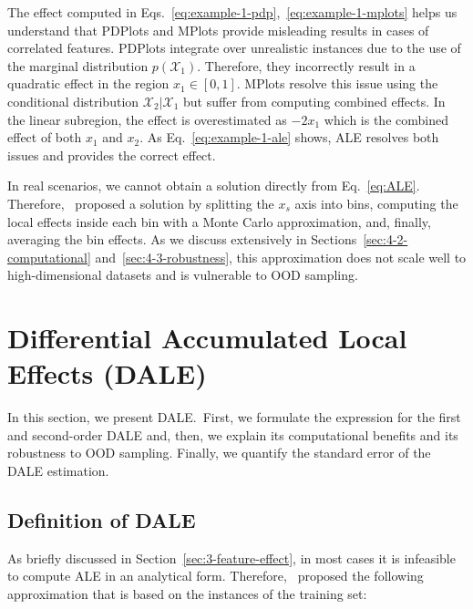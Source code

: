 \documentclass[wcp]{jmlr}
\begin{document}
%
The effect computed in Eqs.~\eqref{eq:example-1-pdp},~\eqref{eq:example-1-mplots} helps us understand that PDPlots and MPlots provide misleading results in cases of correlated features. PDPlots integrate over unrealistic instances due to the use of the marginal distribution \( p(\mathcal{X}_1) \). Therefore, they incorrectly result in a quadratic effect in the region \(x_1 \in [0, 1]\). MPlots resolve this issue using the conditional distribution \( \mathcal{X}_2|\mathcal{X}_1 \) but suffer from computing combined effects. In the linear subregion, the effect is overestimated as \( -2x_1 \) which is the combined effect of both \( x_1 \) and \( x_2 \). As Eq.~\eqref{eq:example-1-ale} shows, ALE resolves both issues and provides the correct effect.

In real scenarios, we cannot obtain a solution directly from Eq.~\eqref{eq:ALE}. Therefore,~\cite{Apley2020} proposed a solution by splitting the \(x_s\) axis into bins, computing the local effects inside each bin with a Monte Carlo approximation, and, finally, averaging the bin effects. As we discuss extensively in Sections~\ref{sec:4-2-computational} and~\ref{sec:4-3-robustness}, this approximation does not scale well to high-dimensional datasets and is vulnerable to OOD sampling.

\section{Differential Accumulated Local Effects (DALE)}

In this section, we present DALE.~First, we formulate the expression for the first and second-order DALE and, then, we explain its computational benefits and its robustness to OOD sampling. Finally, we quantify the standard error of the DALE estimation.

\subsection{Definition of DALE}
\label{sec:4-1-DALE} As briefly discussed in Section~\ref{sec:3-feature-effect}, in most cases it is infeasible to compute ALE in an analytical form. Therefore,~\cite{Apley2020} proposed the following approximation that is based on the instances of the training set:
\end{document}

